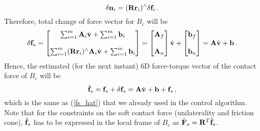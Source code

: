 \documentclass[a4paper, 11pt]{article}
\begin{document}
%
\begin{equation}
  \delta \mathbf{n}_i = (\mathbf{R} \mathbf{r}_i)^{\wedge} \delta \mathbf{f}_i \, .
\end{equation}
%
Therefore, total change of force vector for $B_c$ will be
%
\begin{equation}
  \delta \mathbf{f}_s =
  \begin{bmatrix}
    \sum_{i=1}^m \mathbf{A}_i \dot{\mathbf{v}} + \sum_{i=1}^m \mathbf{b}_i\\
    \\
    \sum_{i=1}^m (\mathbf{R} \mathbf{r}_i)^{\wedge} \mathbf{A}_i \dot{\mathbf{v}} + \sum_{i=1}^m \mathbf{b}_i
  \end{bmatrix}
  =
  \begin{bmatrix}
    \mathbf{A}_f \\
    \\
    \mathbf{A}_n
  \end{bmatrix}
  \dot{\mathbf{v}} +
  \begin{bmatrix}
    \mathbf{b}_f \\
    \\
    \mathbf{b}_n
  \end{bmatrix}
  = \mathbf{A} \dot{\mathbf{v}} + \mathbf{b} \, .
\end{equation}
%
Hence, the estimated (for the next instant) 6D force-torque vector of the
contact force of $B_c$ will be
%
\begin{equation}
  \hat{\mathbf{f}}_s = \mathbf{f}_s + \delta \mathbf{f}_s = \mathbf{A} \dot{\mathbf{v}} + \mathbf{b} + \mathbf{f}_s \, ,
\end{equation}
%
which is the same as (\ref{fs_hat}) that we already used in the control
algorithm.  Note that for the constraints on the soft contact force
(unilaterality and friction cone), $\hat{\mathbf{f}}_s$ has to be expressed in the
local frame of $B_c$ as $\hat{\mathbf{F}}_s = \mathbf{R}^T \hat{\mathbf{f}}_s$.
\end{document}

